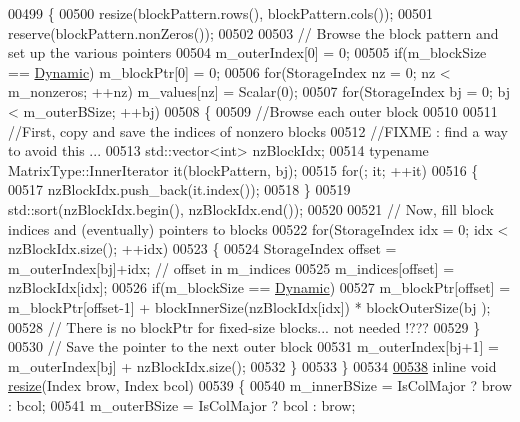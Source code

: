 \begin{DoxyCode}
00499     \{
00500       resize(blockPattern.rows(), blockPattern.cols());
00501       reserve(blockPattern.nonZeros());
00502 
00503       \textcolor{comment}{// Browse the block pattern and set up the various pointers}
00504       m\_outerIndex[0] = 0;
00505       \textcolor{keywordflow}{if}(m\_blockSize == \hyperlink{namespace_eigen_ad81fa7195215a0ce30017dfac309f0b2}{Dynamic}) m\_blockPtr[0] = 0;
00506       \textcolor{keywordflow}{for}(StorageIndex nz = 0; nz < m\_nonzeros; ++nz) m\_values[nz] = Scalar(0);
00507       \textcolor{keywordflow}{for}(StorageIndex bj = 0; bj < m\_outerBSize; ++bj)
00508       \{
00509         \textcolor{comment}{//Browse each outer block}
00510 
00511         \textcolor{comment}{//First, copy and save the indices of nonzero blocks}
00512         \textcolor{comment}{//FIXME : find a way to avoid this ...}
00513         std::vector<int> nzBlockIdx;
00514         \textcolor{keyword}{typename} MatrixType::InnerIterator it(blockPattern, bj);
00515         \textcolor{keywordflow}{for}(; it; ++it)
00516         \{
00517           nzBlockIdx.push\_back(it.index());
00518         \}
00519         std::sort(nzBlockIdx.begin(), nzBlockIdx.end());
00520 
00521         \textcolor{comment}{// Now, fill block indices and (eventually) pointers to blocks}
00522         \textcolor{keywordflow}{for}(StorageIndex idx = 0; idx < nzBlockIdx.size(); ++idx)
00523         \{
00524           StorageIndex offset = m\_outerIndex[bj]+idx; \textcolor{comment}{// offset in m\_indices}
00525           m\_indices[offset] = nzBlockIdx[idx];
00526           \textcolor{keywordflow}{if}(m\_blockSize == \hyperlink{namespace_eigen_ad81fa7195215a0ce30017dfac309f0b2}{Dynamic})
00527             m\_blockPtr[offset] = m\_blockPtr[offset-1] + blockInnerSize(nzBlockIdx[idx]) * blockOuterSize(bj
      );
00528           \textcolor{comment}{// There is no blockPtr for fixed-size blocks... not needed !???}
00529         \}
00530         \textcolor{comment}{// Save the pointer to the next outer block}
00531         m\_outerIndex[bj+1] = m\_outerIndex[bj] + nzBlockIdx.size();
00532       \}
00533     \}
00534 
\hyperlink{group___sparse_core___module_ae0b2c5f1f4aa7a2a54dea00bbcef8e0b}{00538}     \textcolor{keyword}{inline} \textcolor{keywordtype}{void} \hyperlink{group___sparse_core___module_ae0b2c5f1f4aa7a2a54dea00bbcef8e0b}{resize}(Index brow, Index bcol)
00539     \{
00540       m\_innerBSize = IsColMajor ? brow : bcol;
00541       m\_outerBSize = IsColMajor ? bcol : brow;

\end{DoxyCode}
